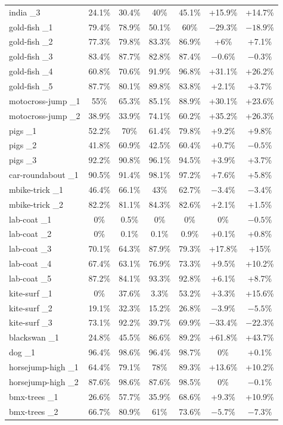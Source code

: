 \documentclass[journal,12pt,onecolumn,draftclsnofoot]{IEEEtran}
\begin{document}
\begin{longtable}{l c c c c c c}
india \_3 & 24.1\% & 30.4\% & 40\% & 45.1\% & +15.9\% & +14.7\% \\
gold-fish \_1 & 79.4\% & 78.9\% & 50.1\% & 60\% & $-29.3\%$ & $-18.9\%$ \\
gold-fish \_2 & 77.3\% & 79.8\% & 83.3\% & 86.9\% & +6\% & +7.1\% \\
gold-fish \_3 & 83.4\% & 87.7\% & 82.8\% & 87.4\% & $-0.6\%$ & $-0.3\%$ \\
gold-fish \_4 & 60.8\% & 70.6\% & 91.9\% & 96.8\% & +31.1\% & +26.2\% \\
gold-fish \_5 & 87.7\% & 80.1\% & 89.8\% & 83.8\% & +2.1\% & +3.7\% \\
motocross-jump \_1 & 55\% & 65.3\% & 85.1\% & 88.9\% & +30.1\% & +23.6\% \\
motocross-jump \_2 & 38.9\% & 33.9\% & 74.1\% & 60.2\% & +35.2\% & +26.3\% \\
pigs \_1 & 52.2\% & 70\% & 61.4\% & 79.8\% & +9.2\% & +9.8\% \\
pigs \_2 & 41.8\% & 60.9\% & 42.5\% & 60.4\% & +0.7\% & $-0.5\%$ \\
pigs \_3 & 92.2\% & 90.8\% & 96.1\% & 94.5\% & +3.9\% & +3.7\% \\
car-roundabout \_1 & 90.5\% & 91.4\% & 98.1\% & 97.2\% & +7.6\% & +5.8\% \\
mbike-trick \_1 & 46.4\% & 66.1\% & 43\% & 62.7\% & $-3.4\%$ & $-3.4\%$ \\
mbike-trick \_2 & 82.2\% & 81.1\% & 84.3\% & 82.6\% & +2.1\% & +1.5\% \\
lab-coat \_1 & 0\% & 0.5\% & 0\% & 0\% & 0\% & $-0.5\%$ \\
lab-coat \_2 & 0\% & 0.1\% & 0.1\% & 0.9\% & +0.1\% & +0.8\% \\
lab-coat \_3 & 70.1\% & 64.3\% & 87.9\% & 79.3\% & +17.8\% & +15\% \\
lab-coat \_4 & 67.4\% & 63.1\% & 76.9\% & 73.3\% & +9.5\% & +10.2\% \\
lab-coat \_5 & 87.2\% & 84.1\% & 93.3\% & 92.8\% & +6.1\% & +8.7\% \\
kite-surf \_1 & 0\% & 37.6\% & 3.3\% & 53.2\% & +3.3\% & +15.6\% \\
kite-surf \_2 & 19.1\% & 32.3\% & 15.2\% & 26.8\% & $-3.9\%$ & $-5.5\%$ \\
kite-surf \_3 & 73.1\% & 92.2\% & 39.7\% & 69.9\% & $-33.4\%$ & $-22.3\%$ \\
blackswan \_1 & 24.8\% & 45.5\% & 86.6\% & 89.2\% & +61.8\% & +43.7\% \\
dog \_1 & 96.4\% & 98.6\% & 96.4\% & 98.7\% & 0\% & +0.1\% \\
horsejump-high \_1 & 64.4\% & 79.1\% & 78\% & 89.3\% & +13.6\% & +10.2\% \\
horsejump-high \_2 & 87.6\% & 98.6\% & 87.6\% & 98.5\% & 0\% & $-0.1\%$ \\
bmx-trees \_1 & 26.6\% & 57.7\% & 35.9\% & 68.6\% & +9.3\% & +10.9\% \\
bmx-trees \_2 & 66.7\% & 80.9\% & 61\% & 73.6\% & $-5.7\%$ & $-7.3\%$ \\
\end{longtable}
\normalsize
\end{document}

